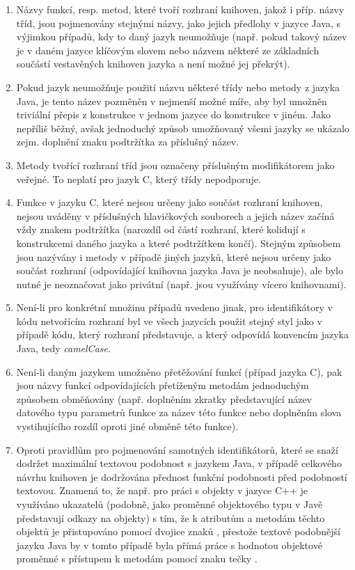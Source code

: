 \documentclass[onepage, a4paper, 12pt]{bakalarka}
\begin{document}
\begin{enumerate}
\item Názvy funkcí, resp. metod, které tvoří rozhraní knihoven, jakož i příp. názvy tříd, jsou pojmenovány stejnými názvy, jako jejich předlohy v jazyce Java, s výjimkou případů, kdy to daný jazyk neumožňuje (např. pokud takový název je v daném jazyce klíčovým slovem nebo názvem některé ze základních součástí vestavěných knihoven jazyka a není možné jej překrýt).
\item Pokud jazyk neumožňuje použití názvu některé třídy nebo metody z jazyka Java, je tento název pozměněn v nejmenší možné míře, aby byl umožněn triviální přepis z konstrukce v jednom jazyce do konstrukce v jiném. Jako nepříliš běžný, avšak jednoduchý způsob umožňovaný všemi jazyky se ukázalo zejm. doplnění znaku podtržítka \uv{\_} za příslušný název.
\item Metody tvořící rozhraní tříd jsou označeny příslušným modifikátorem jako veřejné. To neplatí pro jazyk C, který třídy nepodporuje.
\item Funkce v jazyku C, které nejsou určeny jako součást rozhraní knihoven, nejsou uváděny v příslušných hlavičkových souborech a jejich název začíná vždy znakem podtržítka (narozdíl od částí rozhraní, které kolidují s konstrukcemi daného jazyka a které podtržítkem končí). Stejným způsobem jsou nazývány i metody v případě jiných jazyků, které nejsou určeny jako součást rozhraní (odpovídající knihovna jazyka Java je neobsahuje), ale bylo nutné je neoznačovat jako privátní (např. jsou využívány vícero knihovnami).
\item Není-li pro konkrétní množinu případů uvedeno jinak, pro identifikátory v kódu netvořícím rozhraní byl ve všech jazycích použit stejný styl jako v případě kódu, který rozhraní představuje, a který odpovídá konvencím jazyka Java, tedy \textit{camelCase}.
\item Není-li daným jazykem umožněno přetěžování funkcí (případ jazyka C), pak jsou názvy funkcí odpovídajících přetíženým metodám jednoduchým způsobem obměňovány (např. doplněním zkratky představující název datového typu parametrů funkce za název této funkce nebo doplněním slova vystihujícího rozdíl oproti jiné obměně této funkce).
\item Oproti pravidlům pro pojmenování samotných identifikátorů, které se snaží dodržet maximální textovou podobnost s jazykem Java, v případě celkového návrhu knihoven je dodržována přednost funkční podobnosti před podobností textovou. Znamená to, že např. pro práci s objekty v jazyce C++ je využíváno ukazatelů (podobně, jako proměnné objektového typu v Javě představují odkazy na objekty) s tím, že k atributům a metodám těchto objektů je přistupováno pomocí dvojice znaků \uv{->}, přestože textově podobnější jazyku Java by v tomto případě byla přímá práce s hodnotou objektové proměnné s přístupem k metodám pomocí znaku tečky .
\end{enumerate}
\end{document}

